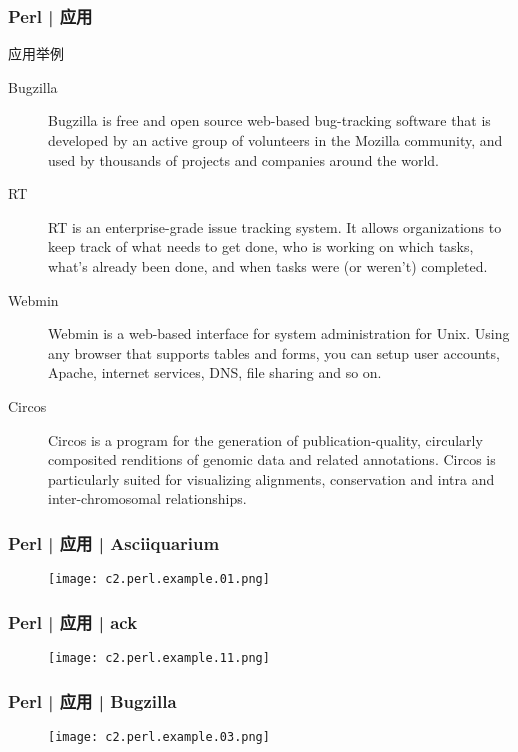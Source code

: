 \begin{frame}
  \frametitle{Perl | 应用}
  {\footnotesize
    \begin{block}{应用举例}
    \begin{description}
      \item[\alert{Bugzilla}] Bugzilla is free and open source web-based bug-tracking software that is developed by an active group of volunteers in the Mozilla community, and used by thousands of projects and companies around the world. 
      \item[RT] RT is an enterprise-grade issue tracking system. It allows organizations to keep track of what needs to get done, who is working on which tasks, what's already been done, and when tasks were (or weren't) completed.
      \item[\alert{Webmin}] Webmin is a web-based interface for system administration for Unix. Using any browser that supports tables and forms, you can setup user accounts, Apache, internet services, DNS, file sharing and so on.
      \item[\alert{Circos}] Circos is a program for the generation of publication-quality, circularly composited renditions of genomic data and related annotations. Circos is particularly suited for visualizing alignments, conservation and intra and inter-chromosomal relationships.
    \end{description}
  \end{block}
  }
\end{frame}

\begin{frame}
  \frametitle{Perl | 应用 | Asciiquarium}
  \begin{figure}
    \centering
    \texttt{[image: c2.perl.example.01.png]}
  \end{figure}
\end{frame}

\begin{frame}
  \frametitle{Perl | 应用 | ack}
  \begin{figure}
    \centering
    \texttt{[image: c2.perl.example.11.png]}
  \end{figure}
\end{frame}

\begin{frame}
  \frametitle{Perl | 应用 | Bugzilla}
  \begin{figure}
    \centering
    \texttt{[image: c2.perl.example.03.png]}
  \end{figure}
\end{frame}

